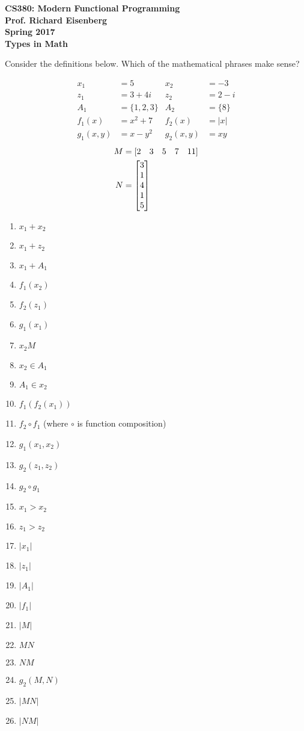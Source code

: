 \documentclass{article}
\begin{document}
\begin{center}
\bf
CS380: Modern Functional Programming\\
Prof. Richard Eisenberg\\
Spring 2017\\[1ex]
Types in Math
\end{center}

Consider the definitions below. Which of the mathematical phrases make sense?

\begin{align*}
x_1 &= 5 & x_2 &= -3\\
z_1 &= 3 + 4i & z_2 &= 2 - i\\
A_1 &= \{1, 2, 3\} & A_2 &= \{8\}\\
f_1(x) &= x^2 + 7 & f_2(x) &= |x|\\
g_1(x,y) &= x - y^2 & g_2(x,y) &= xy
\end{align*}
\begin{align*}
M &= [\begin{array}{@{}ccccc@{}} 2 & 3 & 5 & 7 & 11 \end{array}]\\
N &= \left[\begin{array}{@{}c@{}} 3 \\ 1 \\ 4 \\ 1 \\ 5 \end{array}\right]\\
\end{align*}

\begin{multicols}{2}
\begin{enumerate}
\item $x_1 + x_2$
\item $x_1 + z_2$
\item $x_1 + A_1$
\item $f_1(x_2)$
\item $f_2(z_1)$
\item $g_1(x_1)$
\item $x_2 M$
\item $x_2 \in A_1$
\item $A_1 \in x_2$
\item $f_1(f_2(x_1))$
\item $f_2 \circ f_1$ (where $\circ$ is function composition)
\item $g_1(x_1,x_2)$
\item $g_2(z_1,z_2)$
\item $g_2 \circ g_1$
\item $x_1 > x_2$
\item $z_1 > z_2$
\item $|x_1|$
\item $|z_1|$
\item $|A_1|$
\item $|f_1|$
\item $|M|$
\item $M N$
\item $N M$
\item $g_2(M,N)$
\item $|M N|$
\item $|N M|$
\end{enumerate}
\end{multicols}
\end{document}
